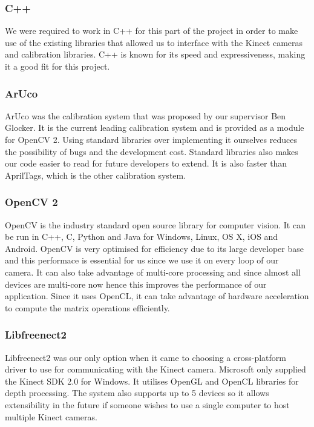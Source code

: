 \documentclass{article}
\begin{document}
\subsubsection{C++}
We were required to work in C++ for this part of the project in order to make use of the existing libraries that allowed us to interface with the Kinect cameras and calibration libraries. C++ is known for its speed and expressiveness, making it a good fit for this project. 
\subsubsection{ArUco}
ArUco was the calibration system that was proposed by our supervisor Ben Glocker. It is the current leading calibration system and is provided as a module for OpenCV 2. Using standard libraries over implementing it ourselves reduces the possibility of bugs and the development cost. Standard libraries also makes our code easier to read for future developers to extend. It is also faster than AprilTags, which is the other calibration system.
\subsubsection{OpenCV 2}
OpenCV is the industry standard open source library for computer vision. It can be run in C++, C, Python and Java for Windows, Linux, OS X, iOS and Android. OpenCV is very optimised for efficiency due to its large developer base and this performace is essential for us since we use it on every loop of our camera. It can also take advantage of multi-core processing and since almost all devices are multi-core now hence this improves the performance of our application. Since it uses OpenCL, it can take advantage of hardware acceleration to compute the matrix operations efficiently.
\subsubsection{Libfreenect2}
Libfreenect2 was our only option when it came to choosing a cross-platform driver to use for communicating with the Kinect camera. Microsoft only supplied the Kinect SDK 2.0 for Windows. It utilises OpenGL and OpenCL libraries for depth processing. The system also supports up to 5 devices so it allows extensibility in the future if someone wishes to use a single computer to host multiple Kinect cameras.
\end{document}
